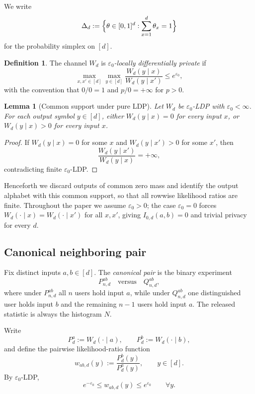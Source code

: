 \documentclass[11pt]{amsart}
\numberwithin{equation}{section}
\newtheorem{lemma}[theorem]{Lemma}
\theoremstyle{definition}
\newtheorem{definition}[theorem]{Definition}
\begin{document}
We write
\[
\Delta_d:=\Bigl\{\theta\in[0,1]^d:\sum_{x=1}^d \theta_x=1\Bigr\}
\]
for the probability simplex on \([d]\).

\begin{definition}
The channel $W_d$ is \emph{$\varepsilon_0$-locally differentially private} if
\[
\max_{x,x' \in [d]} \max_{y \in [d]}
\frac{W_d(y\mid x)}{W_d(y\mid x')} \le e^{\varepsilon_0},
\]
with the convention that $0/0=1$ and $p/0=+\infty$ for $p>0$.
\end{definition}

\begin{lemma}[Common support under pure LDP]\label{lem:common-support}
Let $W_d$ be $\varepsilon_0$-LDP with $\varepsilon_0<\infty$.
For each output symbol $y \in [d]$, either $W_d(y\mid x)=0$ for every input $x$, or
$W_d(y\mid x)>0$ for every input $x$.
\end{lemma}

\begin{proof}
If $W_d(y\mid x)=0$ for some $x$ and $W_d(y\mid x')>0$ for some $x'$, then
\[
\frac{W_d(y\mid x')}{W_d(y\mid x)} = +\infty,
\]
contradicting finite $\varepsilon_0$-LDP.
\end{proof}

Henceforth we discard outputs of common zero mass and identify the output alphabet with this common support,
so that all rowwise likelihood ratios are finite.
Throughout the paper we assume \(\varepsilon_0>0\); the case $\varepsilon_0=0$ forces $W_d(\cdot\mid x)=W_d(\cdot\mid x')$ for all $x,x'$, giving $I_{0,d}(a,b)=0$ and trivial privacy for every $d$.

\subsection*{Canonical neighboring pair}

Fix distinct inputs $a,b \in [d]$.
The \emph{canonical pair} is the binary experiment
\[
P_{n,d}^{ab} \quad \text{versus} \quad Q_{n,d}^{ab},
\]
where under $P_{n,d}^{ab}$ all $n$ users hold input $a$, while under $Q_{n,d}^{ab}$ one distinguished user
holds input $b$ and the remaining $n-1$ users hold input $a$.
The released statistic is always the histogram $N$.

Write
\[
P_d^{a}:=W_d(\cdot\mid a), \qquad P_d^{b}:=W_d(\cdot\mid b),
\]
and define the pairwise likelihood-ratio function
\[
w_{ab,d}(y):=\frac{P_d^{b}(y)}{P_d^{a}(y)},
\qquad y \in [d].
\]
By $\varepsilon_0$-LDP,
\[
e^{-\varepsilon_0} \le w_{ab,d}(y)\le e^{\varepsilon_0}
\qquad\forall y.
\]
\end{document}
